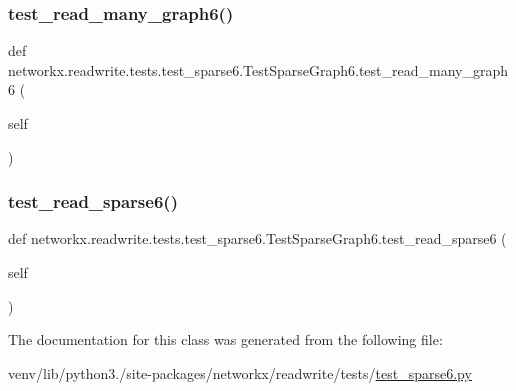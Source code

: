 \subsubsection{\texorpdfstring{test\+\_\+read\+\_\+many\+\_\+graph6()}{test\_read\_many\_graph6()}}
{\footnotesize\ttfamily def networkx.\+readwrite.\+tests.\+test\+\_\+sparse6.\+Test\+Sparse\+Graph6.\+test\+\_\+read\+\_\+many\+\_\+graph6 (\begin{DoxyParamCaption}\item[{}]{self }\end{DoxyParamCaption})}

\mbox{\label{classnetworkx_1_1readwrite_1_1tests_1_1test__sparse6_1_1TestSparseGraph6_a3056df66f2107b06076c7af27ebc92f8}} 
\subsubsection{\texorpdfstring{test\+\_\+read\+\_\+sparse6()}{test\_read\_sparse6()}}
{\footnotesize\ttfamily def networkx.\+readwrite.\+tests.\+test\+\_\+sparse6.\+Test\+Sparse\+Graph6.\+test\+\_\+read\+\_\+sparse6 (\begin{DoxyParamCaption}\item[{}]{self }\end{DoxyParamCaption})}



The documentation for this class was generated from the following file\+:\begin{DoxyCompactItemize}
\item 
venv/lib/python3./site-\/packages/networkx/readwrite/tests/\hyperlink{test__sparse6_8py}{test\+\_\+sparse6.\+py}\end{DoxyCompactItemize}
